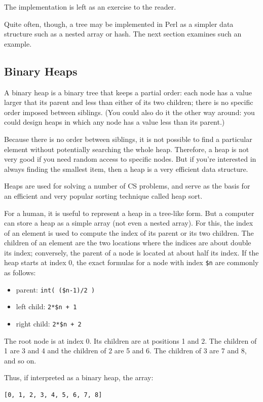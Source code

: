 The implementation is left as an exercise to the reader. 

Quite often, though, a tree may be implemented in Perl 
as a simpler data structure such as a nested array or hash. 
The next section examines such an example.

\subsection{Binary Heaps}
\label{heap}

A binary heap is a binary tree that keeps a partial order: each 
node has a value larger that its parent and less than 
either of its two children; there is no specific order imposed 
between siblings. (You could also do it the other way 
around: you could design heaps in which any node has a value 
less than its parent.)

Because there is no order between siblings, it is not possible 
to find a particular element without potentially searching the 
whole heap. Therefore, a heap is not very good if you need 
random access to specific nodes. But if you're interested 
in always finding the smallest item, then a heap is a 
very efficient data structure.

Heaps are used for solving a number of CS problems, and serve 
as the basis for an efficient and very popular sorting technique 
called heap sort.

For a human, it is useful to represent a heap in a tree-like 
form. But a computer can store a heap as a simple array (not 
even a nested array). For this, the index of an element is 
used to compute the index of its parent or its two children.
The children of an element are the two locations where the 
indices are about double its index; conversely, the parent 
of a node is located at about half its index. If the heap 
starts at index 0, the exact formulas for a node with index 
\verb'$n' are commonly as follows:
\begin{itemize}
\item parent: \verb'int( ($n-1)/2 )'
\item left child: \verb'2*$n + 1'
\item right child: \verb'2*$n + 2'
\end{itemize}
The root node is at index 0. Its children are at positions 
1 and 2. The children of 1 are 3 and 4 and the children of 
2 are 5 and 6. The children of 3 are 7 and 8, and so on.

Thus, if interpreted as a binary heap, the array:
\begin{verbatim}
[0, 1, 2, 3, 4, 5, 6, 7, 8]
\end{verbatim}


